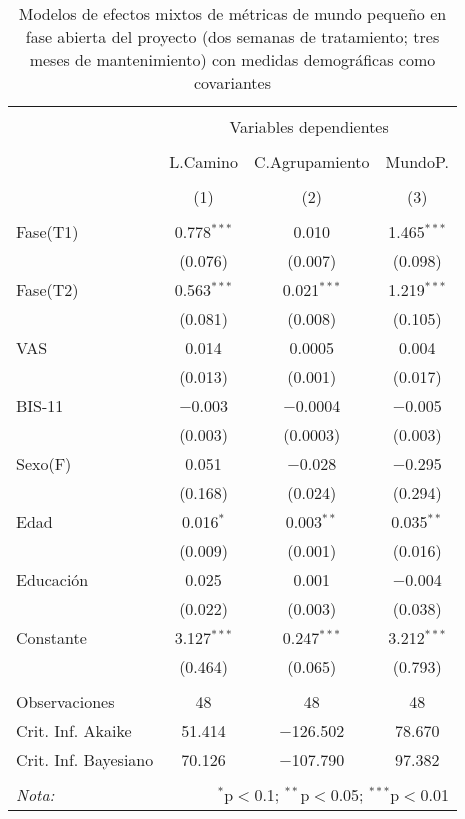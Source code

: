 \begin{table}[!htbp] \centering
    \small
  \caption{Modelos de efectos mixtos de métricas de mundo pequeño en fase abierta del proyecto (dos semanas de tratamiento; tres meses de mantenimiento) con medidas demográficas como covariantes}
  \label{tab:memL12}
\begin{tabular}{@{\extracolsep{5pt}}lccc}
\\[-1.8ex]\hline
\hline \\[-1.8ex]
 & \multicolumn{3}{c}{Variables dependientes} \\
\cline{2-4}
\\[-1.8ex] & L.Camino & C.Agrupamiento & MundoP. \\
\\[-1.8ex] & (1) & (2) & (3)\\
\hline \\[-1.8ex]
 Fase(T1) & 0.778$^{***}$ & 0.010 & 1.465$^{***}$ \\
  & (0.076) & (0.007) & (0.098) \\
  Fase(T2) & 0.563$^{***}$ & 0.021$^{***}$ & 1.219$^{***}$ \\
  & (0.081) & (0.008) & (0.105) \\
  VAS & 0.014 & 0.0005 & 0.004 \\
  & (0.013) & (0.001) & (0.017) \\
  BIS-11 & $-$0.003 & $-$0.0004 & $-$0.005 \\
  & (0.003) & (0.0003) & (0.003) \\
  Sexo(F) & 0.051 & $-$0.028 & $-$0.295 \\
  & (0.168) & (0.024) & (0.294) \\
  Edad & 0.016$^{*}$ & 0.003$^{**}$ & 0.035$^{**}$ \\
  & (0.009) & (0.001) & (0.016) \\
  Educación & 0.025 & 0.001 & $-$0.004 \\
  & (0.022) & (0.003) & (0.038) \\
  Constante & 3.127$^{***}$ & 0.247$^{***}$ & 3.212$^{***}$ \\
  & (0.464) & (0.065) & (0.793) \\
 \hline \\[-1.8ex]
Observaciones & 48 & 48 & 48 \\
Crit. Inf. Akaike & 51.414 & $-$126.502 & 78.670 \\
Crit. Inf. Bayesiano & 70.126 & $-$107.790 & 97.382 \\
\hline
\hline \\[-1.8ex]
\textit{Nota:}  & \multicolumn{3}{r}{$^{*}$p$<$0.1; $^{**}$p$<$0.05; $^{***}$p$<$0.01} \\
\end{tabular}
\end{table}

